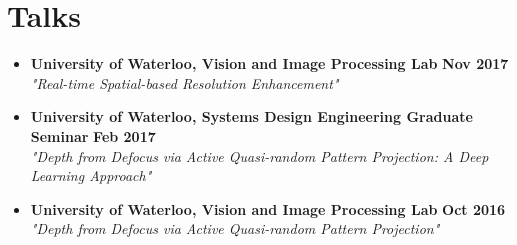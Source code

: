 \section*{Talks}
\vspace{\postsubhead}
\begin{adjustwidth}{\indentleft}{\indentright}
  \begin{itemize}
    
    
    
    
    \item \textbf{University of Waterloo, Vision and Image Processing Lab}
    \hfill
    \textbf{Nov 2017}\\
    \textit{"Real-time Spatial-based Resolution Enhancement"}
    \vspace{\interlist}
    
    
    
    \item \textbf{University of Waterloo, Systems Design Engineering Graduate Seminar}
    \hfill
    \textbf{Feb 2017}\\
    \textit{"Depth from Defocus via Active Quasi-random Pattern Projection: A Deep Learning Approach"}
    \vspace{\interlist}
    
    \item \textbf{University of Waterloo, Vision and Image Processing Lab}
    \hfill
    \textbf{Oct 2016}\\
    \textit{"Depth from Defocus via Active Quasi-random Pattern Projection"}
    \vspace{\interlist}
    
  \end{itemize}
\end{adjustwidth}
